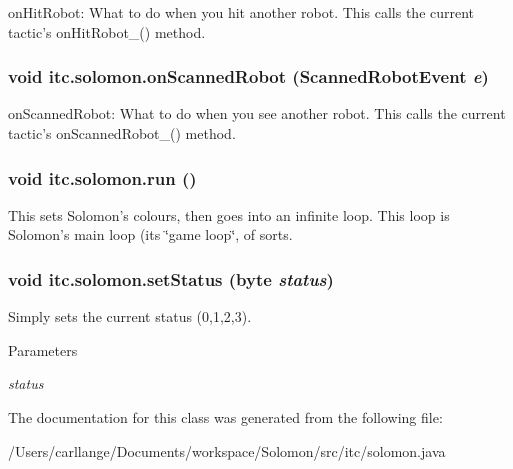 \label{classitc_1_1solomon_a5e824f07f03d305450e42a4356a003a5}
onHitRobot: What to do when you hit another robot. This calls the current tactic's onHitRobot\_\-() method. \hypertarget{classitc_1_1solomon_a7b4f3c0da153c43da17a76c433770419}{
\subsubsection[{onScannedRobot}]{\setlength{\rightskip}{0pt plus 5cm}void itc.solomon.onScannedRobot (ScannedRobotEvent {\em e})}}
\label{classitc_1_1solomon_a7b4f3c0da153c43da17a76c433770419}
onScannedRobot: What to do when you see another robot. This calls the current tactic's onScannedRobot\_\-() method. \hypertarget{classitc_1_1solomon_a34ceb1ef78c0b0af58b074935e011a72}{
\subsubsection[{run}]{\setlength{\rightskip}{0pt plus 5cm}void itc.solomon.run ()}}
\label{classitc_1_1solomon_a34ceb1ef78c0b0af58b074935e011a72}
This sets Solomon's colours, then goes into an infinite loop. This loop is Solomon's main loop (its \char`\"{}game loop\char`\"{}, of sorts. \hypertarget{classitc_1_1solomon_aa16db4d650d1549fd1ae6426af16ea43}{
\subsubsection[{setStatus}]{\setlength{\rightskip}{0pt plus 5cm}void itc.solomon.setStatus (byte {\em status})}}
\label{classitc_1_1solomon_aa16db4d650d1549fd1ae6426af16ea43}
Simply sets the current status (0,1,2,3). 
\begin{DoxyParams}{Parameters}
\item[{\em status}]\end{DoxyParams}


The documentation for this class was generated from the following file:\begin{DoxyCompactItemize}
\item 
/Users/carllange/Documents/workspace/Solomon/src/itc/solomon.java\end{DoxyCompactItemize}

